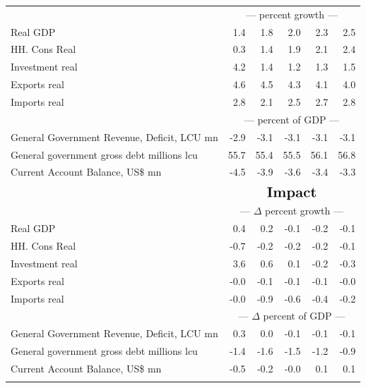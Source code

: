 \documentclass{article}
\begin{document}
\begin{table}[ht]
\begin{tabular}{lrrrrr}
&\multicolumn{5}{c}{{---  percent growth ---}}                                                                                                     \\
Real GDP & 1.4 & 1.8 & 2.0 & 2.3 & 2.5 \\
HH. Cons Real & 0.3 & 1.4 & 1.9 & 2.1 & 2.4 \\
Investment real & 4.2 & 1.4 & 1.2 & 1.3 & 1.5 \\
Exports real & 4.6 & 4.5 & 4.3 & 4.1 & 4.0 \\
Imports real & 2.8 & 2.1 & 2.5 & 2.7 & 2.8 \\
&\multicolumn{5}{c}{{---  percent of GDP ---}}                                                                                                     \\
General Government Revenue, Deficit, LCU mn & -2.9 & -3.1 & -3.1 & -3.1 & -3.1 \\
General government gross debt millions lcu & 55.7 & 55.4 & 55.5 & 56.1 & 56.8 \\
Current Account Balance, US\$ mn & -4.5 & -3.9 & -3.6 & -3.4 & -3.3 \\
&\multicolumn{5}{c}{{ }}                                                                                                     \\
&\multicolumn{5}{c}{{$\Large \textbf{Impact}$}}                                                                                                     \\
&\multicolumn{5}{c}{{--- $\Delta$  percent growth ---}}                                                                                                     \\
Real GDP & 0.4 & 0.2 & -0.1 & -0.2 & -0.1 \\
HH. Cons Real & -0.7 & -0.2 & -0.2 & -0.2 & -0.1 \\
Investment real & 3.6 & 0.6 & 0.1 & -0.2 & -0.3 \\
Exports real & -0.0 & -0.1 & -0.1 & -0.1 & -0.0 \\
Imports real & -0.0 & -0.9 & -0.6 & -0.4 & -0.2 \\
&\multicolumn{5}{c}{{--- $\Delta$  percent of GDP ---}}                                                                                                     \\
General Government Revenue, Deficit, LCU mn & 0.3 & 0.0 & -0.1 & -0.1 & -0.1 \\
General government gross debt millions lcu & -1.4 & -1.6 & -1.5 & -1.2 & -0.9 \\
Current Account Balance, US\$ mn & -0.5 & -0.2 & -0.0 & 0.1 & 0.1 \\
&\multicolumn{5}{c}{{ }}                                                                                                     \\
\bottomrule
\end{tabular}
\end{table}
\end{document}
